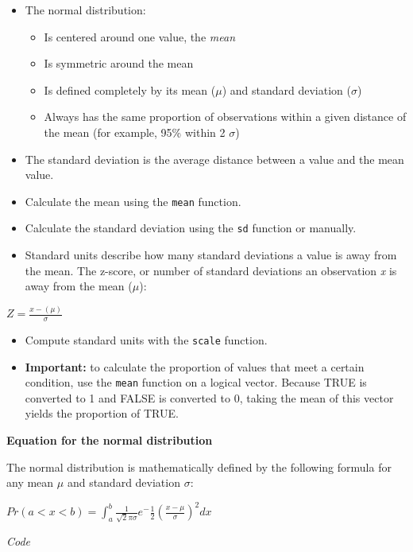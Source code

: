 \documentclass[
]{article}
\providecommand{\tightlist}{%
  \setlength{\itemsep}{0pt}\setlength{\parskip}{0pt}}
\begin{document}
\begin{itemize}
\tightlist
\item
  The normal distribution:

  \begin{itemize}
  \tightlist
  \item
    Is centered around one value, the \emph{mean}
  \item
    Is symmetric around the mean
  \item
    Is defined completely by its mean (\(\mu\)) and standard deviation
    (\(\sigma\))
  \item
    Always has the same proportion of observations within a given
    distance of the mean (for example, 95\% within 2 \(\sigma\))
  \end{itemize}
\item
  The standard deviation is the average distance between a value and the
  mean value.
\item
  Calculate the mean using the \texttt{mean} function.
\item
  Calculate the standard deviation using the \texttt{sd} function or
  manually.
\item
  Standard units describe how many standard deviations a value is away
  from the mean. The z-score, or number of standard deviations an
  observation \emph{x} is away from the mean (\(\mu\)):
\end{itemize}

\(Z = \frac{x - (\mu)}{\sigma}\)

\begin{itemize}
\tightlist
\item
  Compute standard units with the \texttt{scale} function.
\item
  \textbf{Important:} to calculate the proportion of values that meet a
  certain condition, use the \texttt{mean} function on a logical vector.
  Because TRUE is converted to 1 and FALSE is converted to 0, taking the
  mean of this vector yields the proportion of TRUE.
\end{itemize}

\textbf{Equation for the normal distribution}

The normal distribution is mathematically defined by the following
formula for any mean \(\mu\) and standard deviation \(\sigma\):

\(Pr(a < x < b) = \int_{a}^{b} \frac{1}{\sqrt2\pi\sigma} e^-\frac{1}{2}(\frac{x - \mu}{\sigma})^2 dx\)

\emph{Code}
\end{document}

